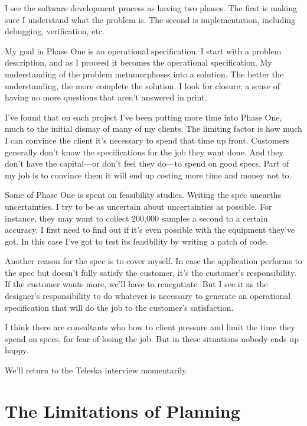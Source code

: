 \begin{tfquot}
\noindent I see the software development process as having two phases. The first is
making sure I understand what the problem is. The second is
implementation, including debugging, verification, etc.

\noindent My goal in Phase One is an operational specification. I start with a problem
description, and as I proceed it becomes the operational specification. My
understanding of the problem metamorphoses into a solution. The better
the understanding, the more complete the solution. I look for closure; a
sense of having no more questions that aren't answered in print.

\noindent I've found that on each project I've been putting more time into Phase One,
much to the initial dismay of many of my clients. The limiting factor is how
much I can convince the client it's necessary to spend that time up front.
Customers generally don't know the specifications for the job they want
done. And they don't have the capital---or don't feel they do---to spend on
good specs. Part of my job is to convince them it will end up costing more
time and money not to.

\noindent Some of Phase One is spent on feasibility studies. Writing the spec
unearths uncertainties. I try to be as uncertain about uncertainties as
possible. For instance, they may want to collect 200,000 samples a second to a
certain accuracy. I first need to find out if it's even possible with the
equipment they've got. In this case I've got to test its feasibility by writing a
patch of code.

\noindent Another reason for the spec is to cover myself. In case the application
performs to the spec but doesn't fully satisfy the customer, it's the customer's
responsibility. If the customer wants more, we'll have to renegotiate. But I
see it as the designer's responsibility to do whatever is necessary to
generate an operational specification that will do the job to the customer's
satisfaction.

\noindent I think there are consultants who bow to client pressure and limit the time
they spend on specs, for fear of losing the job. But in these situations
nobody ends up happy.
\end{tfquot}
\blackline{1ex}

\noindent We'll return to the Teleska interview momentarily.

\section{The Limitations of Planning}

